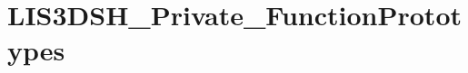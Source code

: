\hypertarget{group__LIS3DSH__Private__FunctionPrototypes}{\section{L\-I\-S3\-D\-S\-H\-\_\-\-Private\-\_\-\-Function\-Prototypes}
\label{group__LIS3DSH__Private__FunctionPrototypes}
}
